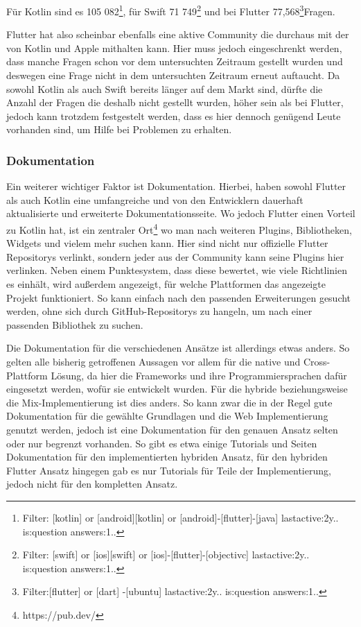 Für Kotlin sind es 105 082\footnote{Filter: [kotlin] or [android][kotlin] or [android]-[flutter]-[java] lastactive:2y.. is:question answers:1..}, für Swift 71 749\footnote{Filter: [swift] or [ios][swift] or [ios]-[flutter]-[objectivc] lastactive:2y.. is:question answers:1..} und bei Flutter 77,568\footnote{Filter:[flutter] or [dart] -[ubuntu] lastactive:2y.. is:question answers:1..}Fragen.

Flutter hat also scheinbar ebenfalls eine aktive Community die durchaus mit der von Kotlin und Apple mithalten kann. Hier muss jedoch eingeschrenkt werden, dass manche Fragen schon vor dem untersuchten Zeitraum gestellt wurden und deswegen eine Frage nicht in dem untersuchten Zeitraum erneut auftaucht. Da sowohl Kotlin als auch Swift bereits länger auf dem Markt sind, dürfte die Anzahl der Fragen die deshalb nicht gestellt wurden, höher sein als bei Flutter, jedoch kann trotzdem festgestelt werden, dass es hier dennoch genügend Leute vorhanden sind, um Hilfe bei Problemen zu erhalten.

\subsubsection{Dokumentation}
Ein weiterer wichtiger Faktor ist Dokumentation. Hierbei, haben sowohl Flutter als auch Kotlin eine umfangreiche und von den Entwicklern dauerhaft aktualisierte und erweiterte Dokumentationsseite. Wo jedoch Flutter einen Vorteil zu Kotlin hat, ist ein zentraler Ort\footnote{https://pub.dev/} wo man nach weiteren Plugins, Bibliotheken, Widgets und vielem mehr suchen kann. Hier sind nicht nur offizielle Flutter Repositorys verlinkt, sondern jeder aus der Community kann seine Plugins hier verlinken. Neben einem Punktesystem, dass diese bewertet, wie viele Richtlinien es einhält, wird außerdem angezeigt, für welche Plattformen das angezeigte Projekt funktioniert. So kann einfach nach den passenden Erweiterungen gesucht werden, ohne sich durch GitHub-Repositorys zu hangeln, um nach einer passenden Bibliothek zu suchen.

Die Dokumentation für die verschiedenen Ansätze ist allerdings etwas anders. So gelten alle bisherig getroffenen Aussagen vor allem für die native und Cross-Plattform Lösung, da hier die Frameworks und ihre Programmiersprachen dafür eingesetzt werden, wofür sie entwickelt wurden. Für die hybride beziehungsweise die Mix-Implementierung ist dies anders. So kann zwar die in der Regel gute Dokumentation für die gewählte Grundlagen und die Web Implementierung genutzt werden, jedoch ist eine Dokumentation für den genauen Ansatz selten oder nur begrenzt vorhanden. So gibt es etwa einige Tutorials und Seiten Dokumentation für den implementierten hybriden Ansatz, für den hybriden Flutter Ansatz hingegen gab es nur Tutorials für Teile der Implementierung, jedoch nicht für den kompletten Ansatz. 

